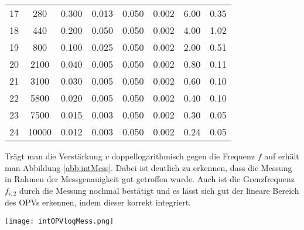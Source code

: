 \begin{center}
\begin{tabular}{l c c c c c | c c}
        17 &    280 &  0.300 &      0.013 &   0.050 &      0.002 &   6.00 &  0.35 \\
        18 &    440 &  0.200 &      0.050 &   0.050 &      0.002 &   4.00 &  1.02 \\
        19 &    800 &  0.100 &      0.025 &   0.050 &      0.002 &   2.00 &  0.51 \\
        20 &   2100 &  0.040 &      0.005 &   0.050 &      0.002 &   0.80 &  0.11 \\
        21 &   3100 &  0.030 &      0.005 &   0.050 &      0.002 &   0.60 &  0.10 \\
        22 &   5800 &  0.020 &      0.005 &   0.050 &      0.002 &   0.40 &  0.10 \\
        23 &   7500 &  0.015 &      0.003 &   0.050 &      0.002 &   0.30 &  0.05 \\
        24 &  10000 &  0.012 &      0.003 &   0.050 &      0.002 &   0.24 &  0.05 \\
    \end{tabular}
    \label{tab:int}
\end{center}
Trägt man die Verstärkung $v$ doppellogarithmisch gegen die Frequenz $f$ auf erhält man Abbildung \ref{abb:intMess}. Dabei ist deutlich zu erkennen, dass die Messung in Rahmen der Messgenauigkeit gut getroffen wurde. Auch ist die Grenzfrequenz $f_{i,2}$ durch die Messung nochmal bestätigt und es lässt sich gut der lineare Bereich des OPVs erkennen, indem dieser korrekt integriert.
\newpage
\begin{center}
    \texttt{[image: intOPVlogMess.png]}
    \label{abb:intMess}
\end{center}
